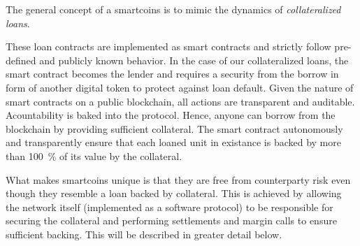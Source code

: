 The general concept of a smartcoins is to mimic the dynamics of
\emph{collateralized loans}.

These loan contracts are implemented as smart contracts and strictly follow
pre-defined and publicly known behavior. In the case of our collateralized
loans, the smart contract becomes the lender and requires a security from the
borrow in form of another digital token to protect against loan default.
Given the nature of smart contracts on a public blockchain, all actions are
transparent and auditable. Acountability is baked into the protocol.
Hence, anyone can borrow from the blockchain by providing sufficient
collateral. The smart contract autonomously and transparently ensure that each
loaned unit in existance is backed by more than \SI{100}{\percent} of its value by the collateral.

What makes smartcoins unique is that they are free from counterparty risk even
though they resemble a loan backed by collateral. This is achieved by allowing
the network itself (implemented as a software protocol) to be responsible for
securing the collateral and performing settlements and margin calls to ensure
sufficient backing. This will be described in greater detail below.
